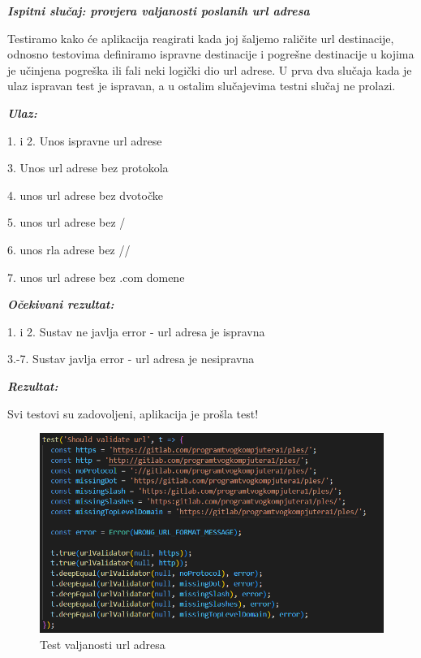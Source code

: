 \textbf{\textit{Ispitni slučaj: provjera valjanosti poslanih url adresa}}

Testiramo kako će aplikacija reagirati kada joj šaljemo raličite url destinacije, odnosno testovima definiramo ispravne destinacije i pogrešne destinacije u kojima je učinjena pogreška ili fali neki logički dio url adrese.
U prva dva slučaja kada je ulaz ispravan test je ispravan, a u ostalim slučajevima testni slučaj ne prolazi.

            \textbf{\textit{Ulaz:}}

             1. i 2. Unos ispravne url adrese     
        
             3. Unos  url adrese bez protokola

	     4. unos url adrese bez dvotočke

	     5. unos url adrese bez /

             6. unos rla adrese bez //

             7. unos url adrese bez .com domene

             \textbf{\textit{Očekivani rezultat:}}

             1. i 2. Sustav ne javlja error - url adresa je ispravna

             3.-7. Sustav  javlja error - url adresa je nesipravna

             \textbf{\textit{Rezultat:}}

             Svi testovi su zadovoljeni, aplikacija je prošla test!

\begin{figure}[H]
			\includegraphics[scale=0.5]{slike/urlTest.PNG} %
			\centering
			\caption{Test valjanosti url adresa}
			\label{fig:ajoj}
			
		\end{figure}
			
